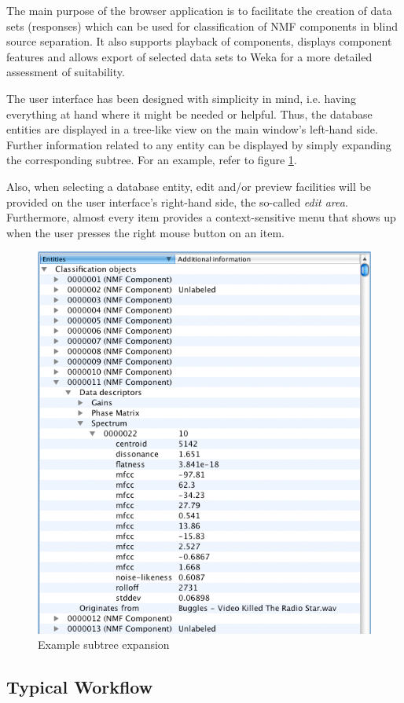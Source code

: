 The main purpose of the browser application is to facilitate the creation
of data sets (responses) which can be used for classification of NMF components
in blind source separation. It also supports playback of components,
displays component features and allows export of selected
data sets to Weka \cite{Weka} for a more detailed assessment of suitability.

The user interface has been designed with simplicity in mind, i.e. having
everything at hand where it might be needed or helpful. Thus, the database
entities are displayed in a tree-like view on the main window's left-hand side.
Further information related to any entity can be displayed by simply expanding
the corresponding subtree. For an example, refer to figure
\ref{figure:ExpandedSubtree}.

Also, when selecting a database entity, edit and/or preview facilities will be
provided on the user interface's right-hand side, the so-called \emph{edit
  area}. Furthermore, almost every item provides a context-sensitive menu that
shows up when the user presses the right mouse button on an item.

\begin{figure}
    \centering
    \includegraphics[width=.5\textwidth]{images/ExpandedSubtree.png}
    \caption{%
        \label{figure:ExpandedSubtree}%
        Example subtree expansion
    }
\end{figure}


\subsection{Typical Workflow}

